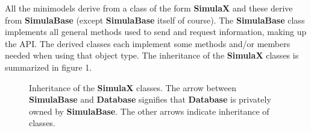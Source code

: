 \documentclass{article}
\begin{document}
\noindent All the minimodels derive from a class of the form \textbf{SimulaX} and these derive from \textbf{SimulaBase} (except \textbf{SimulaBase} itself of course). The \textbf{SimulaBase} class implements all general methods used to send and request information, making up the API. The derived classes each implement some methods and/or members needed when using that object type. The inheritance of the \textbf{SimulaX} classes is summarized in figure 1.
\begin{center}
\begin{figure}[h!]
\caption{Inheritance of the \textbf{SimulaX} classes. The arrow between \textbf{SimulaBase} and \textbf{Database} signifies that \textbf{Database} is privately owned by \textbf{SimulaBase}. The other arrows indicate inheritance of classes.}
\end{figure}
\end{center}

 
\end{document}
